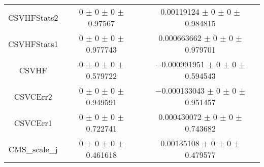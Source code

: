 \begin{table}
\begin{tabular}{ccc}
CSVHFStats2 	& \num{0} $\pm$ \num{0} $\pm$ \num{0} $\pm$ \num{0.97567} 	& \num{0.00119124} $\pm$ \num{0} $\pm$ \num{0} $\pm$ \num{0.984815}\\
CSVHFStats1 	& \num{0} $\pm$ \num{0} $\pm$ \num{0} $\pm$ \num{0.977743} 	& \num{0.000663662} $\pm$ \num{0} $\pm$ \num{0} $\pm$ \num{0.979701}\\
CSVHF 	& \num{0} $\pm$ \num{0} $\pm$ \num{0} $\pm$ \num{0.579722} 	& \num{-0.000991951} $\pm$ \num{0} $\pm$ \num{0} $\pm$ \num{0.594543}\\
CSVCErr2 	& \num{0} $\pm$ \num{0} $\pm$ \num{0} $\pm$ \num{0.949591} 	& \num{-0.000133043} $\pm$ \num{0} $\pm$ \num{0} $\pm$ \num{0.951457}\\
CSVCErr1 	& \num{0} $\pm$ \num{0} $\pm$ \num{0} $\pm$ \num{0.722741} 	& \num{0.000430072} $\pm$ \num{0} $\pm$ \num{0} $\pm$ \num{0.743682}\\
CMS\_scale\_j 	& \num{0} $\pm$ \num{0} $\pm$ \num{0} $\pm$ \num{0.461618} 	& \num{0.00135108} $\pm$ \num{0} $\pm$ \num{0} $\pm$ \num{0.479577}\\
\bottomrule
\end{tabular}
\end{table}